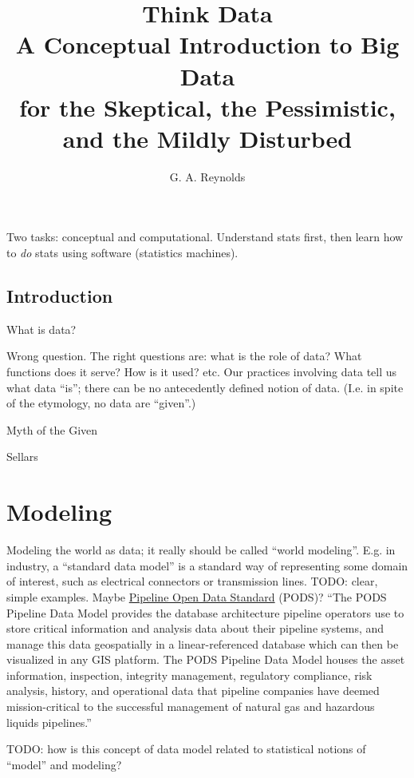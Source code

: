 \documentclass[reqno,12pt]{tufte-book}
\title{Think Data \\
\vspace{12pt}
\Large A Conceptual Introduction to Big Data \\
\vspace{12pt}
\large for the Skeptical, the Pessimistic, and the Mildly Disturbed}
\author{G. A. Reynolds}
\numberwithin{equation}{subsection}
\begin{document}
\maketitle

\begin{remark}
  Two tasks: conceptual and computational.  Understand stats first,
  then learn how to \emph{do} stats using software (statistics
  machines).
\end{remark}

\tableofcontents

\chapter{Introduction}

What is data?

Wrong question.  The right questions are: what is the role of data?
What functions does it serve?  How is it used?  etc.  Our practices
involving data tell us what data ``is''; there can be no antecedently
defined notion of data.  (I.e. in spite of the etymology, no data are
``given''.)

\epigraph{Myth of the Given}{Sellars}

\part{Modeling}

\begin{ednote}
  Modeling the world as data; it really should be called ``world
  modeling''.  E.g. in industry, a ``standard data model'' is a
  standard way of representing some domain of interest, such as
  electrical connectors or transmission lines.  TODO: clear, simple
  examples.  Maybe \href{http://www.pods.org/4/The PODS Data
    Model/}{Pipeline Open Data Standard} (PODS)?  ``The PODS Pipeline Data Model provides the database architecture pipeline operators use to store critical information and analysis data about their pipeline systems, and manage this data geospatially in a linear-referenced database which can then be visualized in any GIS platform.  The PODS Pipeline Data Model houses the asset information, inspection, integrity management, regulatory compliance, risk analysis, history, and operational data that pipeline companies have deemed mission-critical to the successful management of natural gas and hazardous liquids pipelines.''

  TODO: how is this concept of data model related to statistical
  notions of ``model'' and modeling?
\end{ednote}
\end{document}
